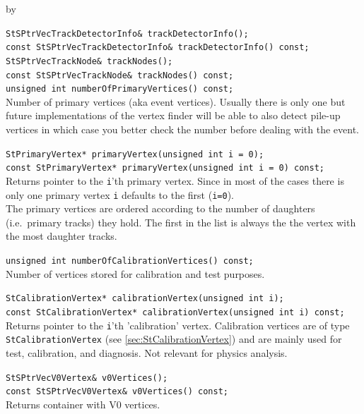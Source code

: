 \documentclass[twoside]{article}
\newcommand{\entrylabel}[1]{\mbox{\textbf{{#1}}}\hfil}%
\newenvironment{entry}
{\begin{list}{}%
    {\renewcommand{\makelabel}{\entrylabel}%
     \setlength{\labelwidth}{90pt}%
     \setlength{\leftmargin}{\labelwidth}
     \advance\leftmargin by \labelsep%
      }%
    }%
  {\end{list}}
\newcommand{\Entrylabel}[1]%
{\raisebox{0pt}[1ex][0pt]{\makebox[\labelwidth][l]%
    {\parbox[t]{\labelwidth}{\hspace{0pt}\textbf{{#1}}}}}}
\newenvironment{Entry}%
{\renewcommand{\entrylabel}{\Entrylabel}\begin{entry}}%
  {\end{entry}}
\begin{document}
\begin{Entry}
    \verb+StSPtrVecTrackDetectorInfo& trackDetectorInfo();+\\
    \verb+const StSPtrVecTrackDetectorInfo& trackDetectorInfo() const;+\\
    
    \verb+StSPtrVecTrackNode& trackNodes();+\\
    \verb+const StSPtrVecTrackNode& trackNodes() const;+\\
    
    \verb+unsigned int numberOfPrimaryVertices() const;+\\
    Number of primary vertices (aka event vertices).  Usually there is
    only one but future implementations of the vertex finder will be
    able to also detect pile-up vertices in which case you better
    check the number before dealing with the event.
    
    \verb+StPrimaryVertex* primaryVertex(unsigned int i = 0);+\\
    \verb+const StPrimaryVertex* primaryVertex(unsigned int i = 0) const;+\\
    Returns pointer to the \texttt{i}'th primary vertex.  Since in
    most of the cases there is only one primary vertex \texttt{i}
    defaults to the first (\texttt{i=0}).\\
    The primary vertices are ordered according to the number of daughters
    (i.e.~primary tracks) they hold. The first in the list is always the
    the vertex with the most daughter tracks.

    \verb+unsigned int numberOfCalibrationVertices() const;+\\
    Number of vertices stored for calibration and test purposes.
    
    \verb+StCalibrationVertex* calibrationVertex(unsigned int i);+\\
    \verb+const StCalibrationVertex* calibrationVertex(unsigned int i) const;+\\
    Returns pointer to the \texttt{i}'th 'calibration' vertex. Calibration
    vertices are of type \texttt{StCalibrationVertex} (see \ref{sec:StCalibrationVertex})
    and are mainly used for test, calibration, and diagnosis. Not relevant for physics analysis.
    
    \verb+StSPtrVecV0Vertex& v0Vertices();+\\
    \verb+const StSPtrVecV0Vertex& v0Vertices() const;+\\
    Returns container with V0 vertices.
    

\end{Entry}
\end{document}
